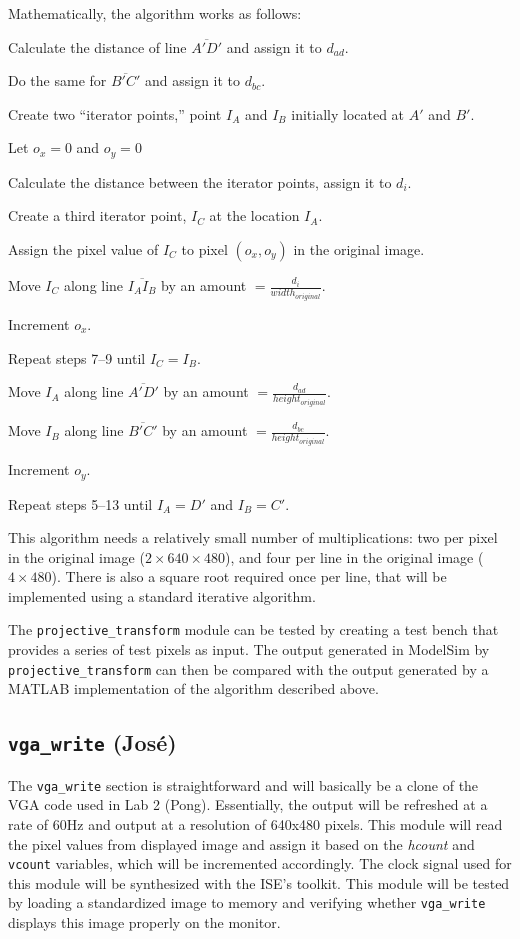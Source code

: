 \documentclass[10pt]{article}
\begin{document}
Mathematically, the algorithm works as follows:
\begin{enumerate*}
\item Calculate the distance of line $\overline{A\prime D\prime}$ and assign it to $d_{ad}$.
\item Do the same for $\overline{B\prime C\prime}$ and assign it to $d_{bc}$.
\item Create two ``iterator points,'' point $I_A$ and $I_B$ initially located at $A\prime$ and $B\prime$.
\item Let $o_x = 0$ and $o_y = 0$
\item Calculate the distance between the iterator points, assign it to $d_i$.
\item Create a third iterator point, $I_C$ at the location $I_A$.
\item Assign the pixel value of $I_C$ to pixel $(o_x, o_y)$ in the original image.
\item Move $I_C$ along line $\overline{I_A I_B}$ by an amount $= \frac{d_i}{width_{original}}$.
\item Increment $o_x$.
\item Repeat steps 7--9 until $I_C = I_B$.
\item Move $I_A$ along line $\overline{A\prime D\prime}$ by an amount $= \frac{d_{ad}}{height_{original}}$.
\item Move $I_B$ along line $\overline{B\prime C\prime}$ by an amount $= \frac{d_{bc}}{height_{original}}$.
\item Increment $o_y$.
\item Repeat steps 5--13 until $I_A = D\prime$ and $I_B = C\prime$.
\end{enumerate*}

This algorithm needs a relatively small number of multiplications: two per pixel in the original image ($2\times640\times480$), and four per line in the original image ($4\times480$). There is also a square root required once per line, that will be implemented using a standard iterative algorithm.

The {\tt projective\_transform} module can be tested by creating a test bench that provides a series of test pixels as input. The output generated in ModelSim by {\tt projective\_transform} can then be compared with the output generated by a MATLAB implementation of the algorithm described above.

\subsection{{\tt vga\_write} (Jos\'{e})}
The {\tt vga\_write} section is straightforward and will basically be a clone of the VGA code used in Lab 2 (Pong). Essentially, the output will be refreshed at a rate of 60Hz and output at a resolution of 640x480 pixels. This module will read the pixel values from displayed image and assign it based on the {\it hcount} and {\tt vcount} variables, which will be incremented accordingly. The clock signal used for this module will be synthesized with the ISE's toolkit. This module will be tested by loading a standardized image to memory and verifying whether {\tt vga\_write} displays this image properly on the monitor.
\end{document}

